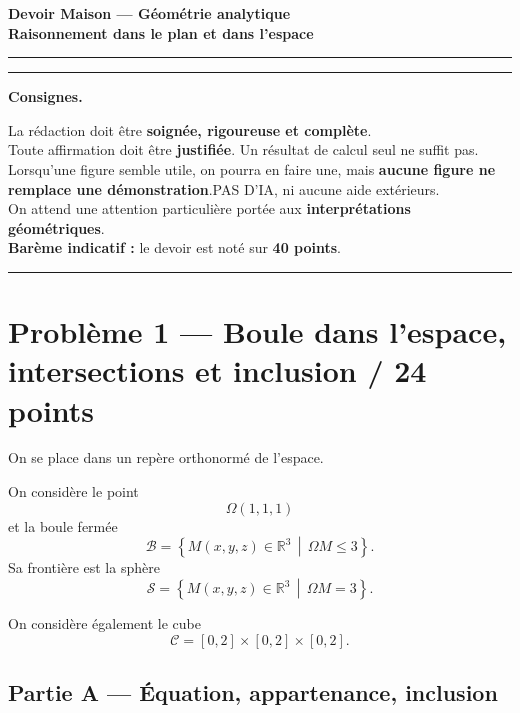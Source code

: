 \documentclass[11pt,a4paper]{article}
\newcommand{\R}{\mathbb{R}}
\newcommand{\Boule}{\mathcal{B}}
\newcommand{\Sphere}{\mathcal{S}}
\newcommand{\Cube}{\mathcal{C}}
\newenvironment{consigne}
{\begin{center}
\begin{minipage}{0.94\textwidth}
\small
\color{black}
\hrule
\vspace{0.4em}
\textbf{Consignes.}
}
{
\vspace{0.4em}
\hrule
\end{minipage}
\end{center}
}
\begin{document}
\begin{center}
    {\Large \textbf{Devoir Maison --- Géométrie analytique}}\\[0.4em]
    {\large \textbf{Raisonnement dans le plan et dans l'espace}}\\[0.8em]
    \rule{0.75\textwidth}{0.6pt}
\end{center}

\vspace{0.3em}


\vspace{0.8em}

\begin{consigne}
La rédaction doit être \textbf{soignée, rigoureuse et complète}.\\
Toute affirmation doit être \textbf{justifiée}. Un résultat de calcul seul ne suffit pas.\\
Lorsqu'une figure semble utile, on pourra en faire une, mais \textbf{aucune figure ne remplace une démonstration}.PAS D'IA, ni aucune aide extérieurs.\\
On attend une attention particulière portée aux \textbf{interprétations géométriques}.\\
\textbf{Barème indicatif :} le devoir est noté sur \textbf{40 points}.
\end{consigne}

\vspace{0.8em}

\section*{Problème 1 --- Boule dans l'espace, intersections et inclusion \hfill / 24 points}

On se place dans un repère orthonormé de l'espace.

On considère le point
\[
\Omega(1,1,1)
\]
et la boule fermée
\[
\Boule=\left\{M(x,y,z)\in\R^3 \,\middle|\, \Omega M\le 3\right\}.
\]
Sa frontière est la sphère
\[
\Sphere=\left\{M(x,y,z)\in\R^3 \,\middle|\, \Omega M=3\right\}.
\]

On considère également le cube
\[
\Cube=[0,2]\times[0,2]\times[0,2].
\]

\subsection*{Partie A --- Équation, appartenance, inclusion}
\end{document}

